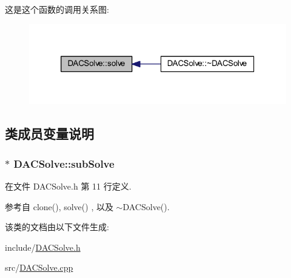 这是这个函数的调用关系图\+:
\nopagebreak
\begin{figure}[H]
\begin{center}
\leavevmode
\includegraphics[width=320pt]{classDACSolve_a45deda5b055671bbcee609cbf1500fdc_icgraph}
\end{center}
\end{figure}




\subsection{类成员变量说明}
\subsubsection[{\texorpdfstring{sub\+Solve}{subSolve}}]{$\ast$ D\+A\+C\+Solve\+::sub\+Solve}\hypertarget{classDACSolve_ae29a23fdf07424e738f99abf75de9dd4}{}\label{classDACSolve_ae29a23fdf07424e738f99abf75de9dd4}


在文件 D\+A\+C\+Solve.\+h 第 11 行定义.



参考自 clone(), solve() , 以及 $\sim$\+D\+A\+C\+Solve().



该类的文档由以下文件生成\+:\begin{DoxyCompactItemize}
\item 
include/\hyperlink{DACSolve_8h}{D\+A\+C\+Solve.\+h}\item 
src/\hyperlink{DACSolve_8cpp}{D\+A\+C\+Solve.\+cpp}\end{DoxyCompactItemize}
